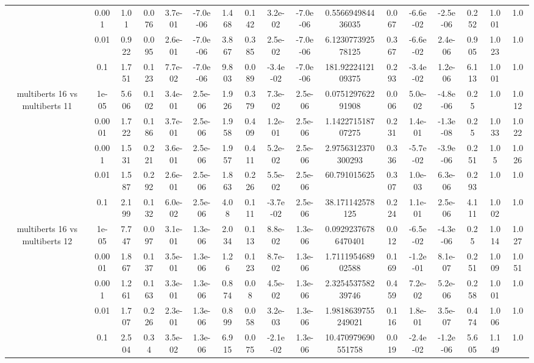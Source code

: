 \begin{tabular}{|c|c|c|c|c|c|c|c|c|c|c|c|c|c|c|c|c|}
 & 0.001 & 1.01 & 0.076 & 3.7e-01 & -7.0e-06 & 1.468 & 0.142 & 3.2e-02 & -7.0e-06 & 0.556694984436035 & 0.067 & -6.6e-02 & -2.5e-06 & 0.252 & 1.001 & 1.0 \\
 & 0.01 & 0.922 & 0.095 & 2.6e-01 & -7.0e-06 & 3.867 & 0.385 & 2.5e-02 & -7.0e-06 & 6.123077392578125 & 0.367 & -6.6e-02 & 2.4e-06 & 0.905 & 1.023 & 1.0 \\
 & 0.1 & 1.751 & 0.123 & 7.7e-02 & -7.0e-06 & 9.803 & 0.089 & -3.4e-02 & -7.0e-06 & 181.9222412109375 & 0.293 & -3.4e-02 & 1.2e-06 & 6.113 & 1.001 & 1.0 \\
\hline
\multirow{5}{*}{multiberts 16 vs multiberts 11} & 1e-05 & 5.606 & 0.102 & 3.4e-01 & 2.5e-06 & 1.926 & 0.379 & 7.3e-02 & 2.5e-06 & 0.075129762291908 & 0.006 & 5.0e-02 & -4.8e-06 & 0.25 & 1.0 & 1.012 \\
 & 0.0001 & 1.722 & 0.186 & 3.7e-01 & 2.5e-06 & 1.958 & 0.409 & 1.2e-01 & 2.5e-06 & 1.142271518707275 & 0.231 & 1.4e-01 & -1.3e-08 & 0.25 & 1.033 & 1.022 \\
 & 0.001 & 1.531 & 0.221 & 3.6e-01 & 2.5e-06 & 1.957 & 0.411 & 5.2e-02 & 2.5e-06 & 2.9756312370300293 & 0.336 & -5.7e-02 & -3.9e-06 & 0.251 & 1.05 & 1.026 \\
 & 0.01 & 1.587 & 0.292 & 2.6e-01 & 2.5e-06 & 1.863 & 0.226 & 5.5e-02 & 2.5e-06 & 60.791015625 & 0.307 & 1.0e-03 & 6.3e-06 & 0.293 & 1.0 & 1.0 \\
 & 0.1 & 2.199 & 0.132 & 6.0e-02 & 2.5e-06 & 4.08 & 0.111 & -3.7e-02 & 2.5e-06 & 38.171142578125 & 0.224 & 1.1e-01 & 2.5e-06 & 4.111 & 1.002 & 1.0 \\
\hline
\multirow{5}{*}{multiberts 16 vs multiberts 12} & 1e-05 & 7.747 & 0.097 & 3.1e-01 & 1.3e-06 & 2.034 & 0.113 & 8.8e-02 & 1.3e-06 & 0.09292376786470401 & 0.012 & -6.5e-02 & -4.3e-06 & 0.25 & 1.014 & 1.027 \\
 & 0.0001 & 1.867 & 0.137 & 3.5e-01 & 1.3e-06 & 1.26 & 0.123 & 8.7e-02 & 1.3e-06 & 1.711195468902588 & 0.169 & -1.2e-01 & 8.1e-07 & 0.251 & 1.009 & 1.051 \\
 & 0.001 & 1.261 & 0.163 & 3.3e-01 & 1.3e-06 & 0.874 & 0.08 & 4.5e-02 & 1.3e-06 & 2.325453758239746 & 0.459 & 7.2e-02 & 5.2e-06 & 0.258 & 1.001 & 1.0 \\
 & 0.01 & 1.707 & 0.226 & 2.3e-01 & 1.3e-06 & 0.899 & 0.058 & 3.2e-03 & 1.3e-06 & 1.9818639755249021 & 0.116 & 1.8e-01 & 3.5e-07 & 0.474 & 1.006 & 1.0 \\
 & 0.1 & 2.504 & 0.34 & 3.5e-02 & 1.3e-06 & 6.915 & 0.075 & -2.1e-02 & 1.3e-06 & 10.470979690551758 & 0.019 & -2.4e-02 & -1.2e-06 & 5.605 & 1.149 & 1.0 \\

\end{tabular}
